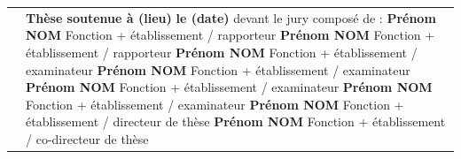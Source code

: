 \documentclass[10pt]{book}
\begin{document}
\begin{titlepage}
\begin{center}
\begin{minipage}{\glarg}
\begin{tabular}{p{7cm}p{10cm}}
\begin{minipage}{\plarg}
\hspace{-1.8cm}{\huge\bf d'antennes 3D...}
\end{minipage}
&
\begin{minipage}{\plarg}
{\large\bf Th\`ese soutenue \`a (lieu)\vspace{1mm}\newline}
{\large\bf le (date)\vspace{2mm}\newline}
{\large devant le jury compos\'e de : \vspace{2mm}\newline}
{\Large\bf Pr\'enom NOM\vspace{0mm}\newline}
{ Fonction + \'etablissement \!/\! rapporteur\vspace{1mm}\newline}
{\Large\bf Pr\'enom NOM\vspace{0mm}\newline}
{ Fonction + \'etablissement \!/\! rapporteur\vspace{1mm}\newline}
{\Large\bf Pr\'enom NOM\vspace{0mm}\newline}
{ Fonction + \'etablissement \!/\! examinateur\vspace{1mm}\newline}
{\Large\bf Pr\'enom NOM\vspace{0mm}\newline}
{ Fonction + \'etablissement \!/\! examinateur\vspace{1mm}\newline}
{\Large\bf Pr\'enom NOM\vspace{0mm}\newline}
{ Fonction + \'etablissement \!/\! examinateur\vspace{1mm}\newline}
{\Large\bf Pr\'enom NOM\vspace{0mm}\newline}
{ Fonction + \'etablissement \!/\! examinateur\vspace{1mm}\newline}
{\Large\bf Pr\'enom NOM\vspace{0mm}\newline}
{ Fonction + \'etablissement \!/\! directeur de th\`ese\vspace{1mm}\newline}
{\Large\bf Pr\'enom NOM\vspace{0mm}\newline}
{ Fonction + \'etablissement \!/\! co-directeur de th\`ese}

\end{minipage}
\end{tabular}

\end{minipage}
\end{center}
\end{titlepage}
\end{document}
